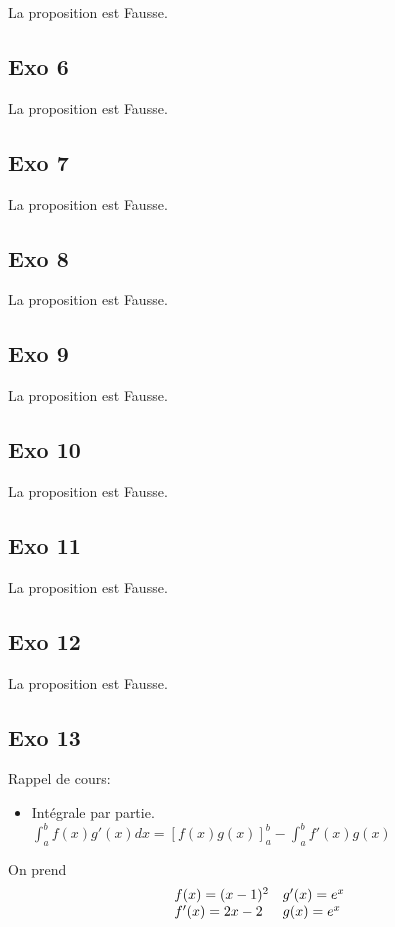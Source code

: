 \documentclass[]{book}
\theoremstyle{definition}
\begin{document}
La proposition est Fausse.

\subsection*{Exo 6}

La proposition est Fausse.

\subsection*{Exo 7}

La proposition est Fausse.

\subsection*{Exo 8}

La proposition est Fausse.

\subsection*{Exo 9}

La proposition est Fausse.

\subsection*{Exo 10}

La proposition est Fausse.

\subsection*{Exo 11}

La proposition est Fausse.

\subsection*{Exo 12}

La proposition est Fausse.

\subsection*{Exo 13}
Rappel de cours:
\begin{itemize}
\item Int\'egrale par partie. $\int_{a}^{b} f(x)g'(x)dx = [f(x)g(x)]_{a}^{b} - \int_{a}^{b}f'(x)g(x)$
\end{itemize}

On prend
$$
\begin{array}{l l}
 f(x) = (x-1)^2 & g'(x) = e^x\\
 f'(x) = 2x-2   & g(x) = e^x\\
\end{array}
$$
\end{document}
